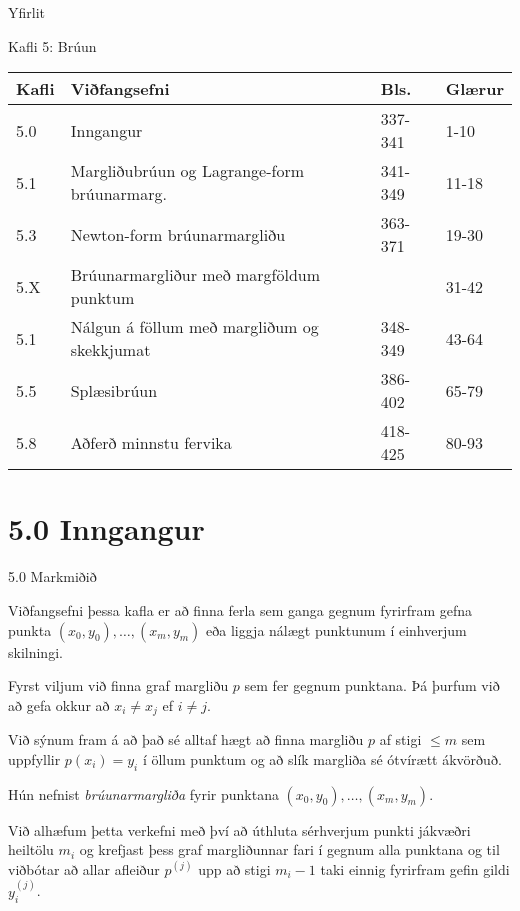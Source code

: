 \date{29~og 31~janúar, og 5, 7, 12 og 14~febrúar 2014}



\begin{frame}
	\maketitle
\end{frame}

\begin{frame}{Yfirlit}
\begin{block}{Kafli 5: Brúun}
\begin{center}
\small{
\begin{tabular}{|l|l|l|l|}\hline
Kafli &Viðfangsefni &Bls. & Glærur\\
\hline
5.0 &Inngangur &337-341 & 1-10\\
5.1 &Margliðubrúun og Lagrange-form brúunarmarg. & 341-349 & 11-18\\
5.3 &Newton-form brúunarmargliðu & 363-371 & 19-30\\
5.X &Brúunarmargliður með margföldum punktum & & 31-42\\
5.1 & Nálgun á föllum með margliðum og skekkjumat & 348-349 & 43-64\\
5.5 &Splæsibrúun& 386-402 & 65-79\\
5.8 & Aðferð minnstu fervika& 418-425 & 80-93\\
\hline
\end{tabular}
}
\end{center}
\end{block}
\end{frame}

\section*{5.0  	Inngangur}
\begin{frame}{5.0 Markmiðið} 

Viðfangsefni þessa kafla er að finna ferla sem ganga gegnum fyrirfram
gefna punkta $(x_0,y_0),\dots,(x_m,y_m)$ eða liggja nálægt punktunum í
einhverjum skilningi.

\pause
\smallskip
Fyrst viljum við finna graf margliðu $p$ sem 
fer gegnum punktana.  Þá þurfum við að gefa okkur
að $x_i\neq x_j$ ef $i\neq j$.  

\pause
\smallskip
Við sýnum fram á 
að það sé alltaf hægt að finna margliðu $p$ af stigi $\leq m$ sem
uppfyllir  $p(x_i)=y_i$ í  öllum punktum
og að slík  margliða sé ótvírætt
ákvörðuð.

\pause
\smallskip
Hún nefnist {\it brúunarmargliða} fyrir punktana
$(x_0,y_0),\dots,(x_m,y_m)$. 

\pause
\smallskip
Við alhæfum þetta verkefni með því 
að úthluta sérhverjum punkti jákvæðri heiltölu $m_i$ og krefjast
þess graf margliðunnar fari í gegnum alla punktana og til viðbótar
að allar afleiður $p^{(j)}$ upp að  stigi $m_i-1$ taki einnig fyrirfram
gefin gildi $y^{(j)}_i$.  
\end{frame}

